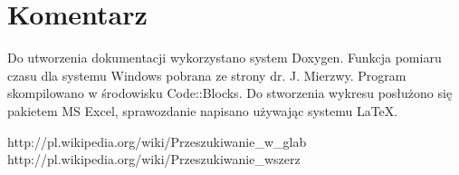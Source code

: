 	\section{Komentarz}\label{sec:Komentarz}
	Do utworzenia dokumentacji wykorzystano system Doxygen. Funkcja pomiaru czasu dla systemu Windows pobrana ze strony dr. J. Mierzwy. Program skompilowano w środowisku Code::Blocks. Do stworzenia wykresu posłużono się pakietem MS Excel, sprawozdanie napisano używając systemu \LaTeX.
	
\begin{thebibliography}{99}
	 http://pl.wikipedia.org/wiki/Przeszukiwanie\_w\_glab
	 http://pl.wikipedia.org/wiki/Przeszukiwanie\_wszerz
\end{thebibliography}


